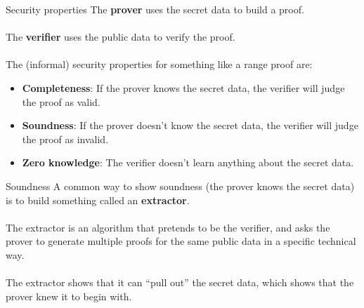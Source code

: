 \documentclass[aspectratio=169]{beamer}
\begin{document}
\begin{frame}{Security properties}
    The \textbf{prover} uses the secret data to build a proof. \\~\\

    The \textbf{verifier} uses the public data to verify the proof. \\~\\

    The (informal) security properties for something like a range proof are:
    \begin{itemize}
        \item \textbf{Completeness}: If the prover knows the secret data, the verifier will judge the proof as valid.
        \item \textbf{Soundness}: If the prover doesn't know the secret data, the verifier will judge the proof as invalid.
        \item \textbf{Zero knowledge}: The verifier doesn't learn anything about the secret data.
    \end{itemize}
\end{frame}

\begin{frame}{Soundness}
    A common way to show soundness (the prover knows the secret data) is to build something called an \textbf{extractor}. \\~\\

    The extractor is an algorithm that pretends to be the verifier, and asks the prover to generate multiple proofs for the same public data in a specific technical way. \\~\\

    The extractor shows that it can ``pull out'' the secret data, which shows that the prover knew it to begin with.

    \begin{figure}
    \end{figure}
\end{frame}
\end{document}
